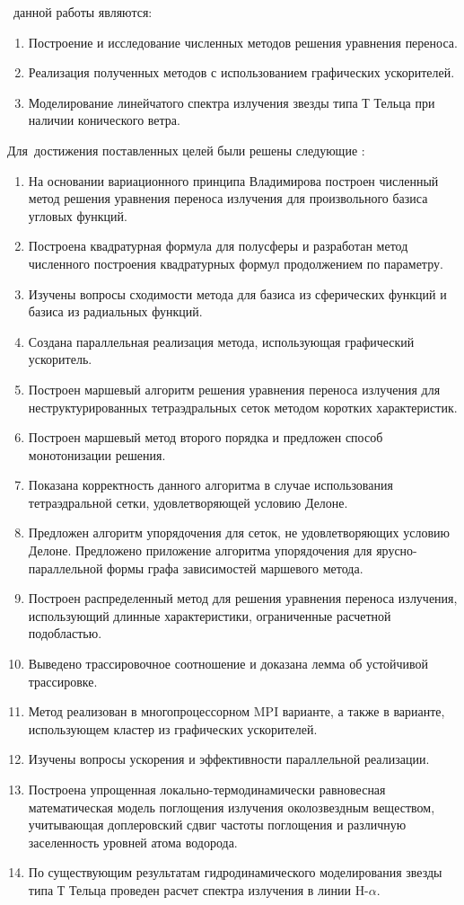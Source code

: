  \aim\ данной работы являются:
\begin{enumerate}
  \item Построение и исследование численных методов решения уравнения переноса.
  \item Реализация полученных методов с использованием графических ускорителей.
  \item Моделирование линейчатого спектра излучения звезды типа Т Тельца при наличии конического ветра. 
\end{enumerate}

Для~достижения поставленных целей были решены следующие {\tasks}:
\begin{enumerate}
  \item На основании вариационного принципа Владимирова построен численный метод решения уравнения переноса излучения для произвольного базиса угловых функций.
  \item Построена квадратурная формула для полусферы и разработан метод численного построения квадратурных формул продолжением по параметру.
  \item Изучены вопросы сходимости метода для базиса из сферических функций и базиса из радиальных функций.
  \item Создана параллельная реализация метода, использующая графический ускоритель.
  
  \item Построен маршевый алгоритм решения уравнения переноса излучения для неструктурированных тетраэдральных сеток методом коротких характеристик.
  \item Построен маршевый метод второго порядка и предложен способ монотонизации решения.
  \item Показана корректность данного алгоритма в случае использования тетраэдральной сетки, удовлетворяющей условию Делоне.
  \item Предложен алгоритм упорядочения для сеток, не удовлетворяющих условию Делоне. Предложено приложение алгоритма упорядочения для ярусно-параллельной формы графа зависимостей маршевого метода.
  
  \item Построен распределенный метод для решения уравнения переноса излучения, использующий длинные характеристики, ограниченные расчетной подобластью.
  \item Выведено трассировочное соотношение и доказана лемма об устойчивой трассировке.
  \item Метод реализован в многопроцессорном MPI варианте, а также в варианте, использующем кластер из графических ускорителей.
  \item Изучены вопросы ускорения и эффективности параллельной реализации.
  
  \item Построена упрощенная локально-термодинамически равновесная математическая модель поглощения излучения околозвездным веществом, учитывающая доплеровский сдвиг частоты поглощения и различную заселенность уровней атома водорода.
  \item По существующим результатам гидродинамического моделирования звезды типа Т Тельца проведен расчет спектра излучения в линии $\text{H-}\alpha$.
\end{enumerate}

